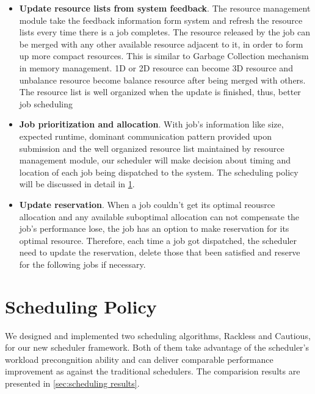 \documentclass[conference]{IEEEtran}
\begin{document}
\begin{itemize}

    \item \textbf{Update resource lists from system feedback}. The resource management module take the feedback information form system and refresh the resource lists every time there is a job completes. The resource released by the job can be merged with any other available resource adjacent to it, in order to form up more compact resources. This is similar to Garbage Collection mechanism in memory management. 1D or 2D resource can become 3D resource and unbalance resource become balance resource after being merged with others. The resource list is well organized when the update is finished, thus, better job scheduling 
    
    \item \textbf{Job prioritization and allocation}. With job's information like size, expected runtime, dominant communication pattern provided upon submission and the well organized resource list maintained by resource management module, our scheduler will make decision about timing and location of each job being dispatched to the system. The scheduling policy will be discussed in detail in \ref{sec:scheduling policy}.

    
    \item \textbf{Update reservation}. When a job couldn't get its optimal reousrce allocation and any available suboptimal allocation can not compensate the job's performance lose, the job has an option to make reservation for its optimal resource. Therefore, each time a job got dispatched, the scheduler need to update the reservation, delete those that been satisfied and reserve for the following jobs if necessary.


\end{itemize}



\section{Scheduling Policy}
\label{sec:scheduling policy}

We designed and implemented two scheduling algorithms, Rackless and Cautious, for our new scheduler framework. Both of them take advantage of the scheduler's workload precongnition ability and can deliver comparable performance improvement 
as against the traditional schedulers. The comparision results are presented in \ref{sec:scheduling results}.
\end{document}
